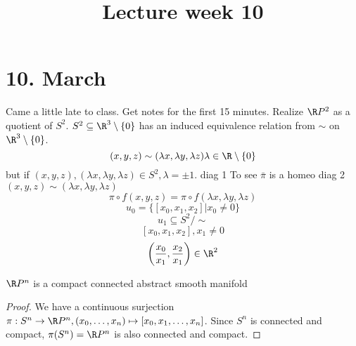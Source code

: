 \title{Lecture week 10}
\maketitle
\section{10. March}
Came a little late to class. Get notes for the first 15 minutes.
\newline Realize $\R P^2$ as a quotient of $S^2$. $S^2\subseteq \R^3\setminus\{0\}$ has an induced equivalence relation from $\sim$ on $\R^3\setminus\{0\}$.
  $$(x,y,z) \sim (\lambda x, \lambda y, \lambda z) \lambda \in \R\setminus\{0\}$$
  but if $(x,y,z), (\lambda x, \lambda y, \lambda z)\in S^2, \lambda = \pm 1$.
  \newline diag 1
  \newline
   To see $\bar{\pi}$ is a homeo
  \newline diag 2
  \newline $(x,y,z)\sim (\lambda x, \lambda y, \lambda z)$
  $$\pi \circ f(x,y,z) = \pi \circ f(\lambda x, \lambda y, \lambda z)$$
  $$u_0=\{[x_0,x_1,x_2] | x_0 \neq 0 \}$$
  $$u_1 \subseteq S^2/\sim$$
  $$[x_0,x_1,x_2], x_1 \neq 0$$
  $$\left(\frac{x_0}{x_1}, \frac{x_2}{x_1}\right)\in \R^2$$
  \begin{theorem}
    $\R P^n$ is a compact connected abstract smooth manifold
  \end{theorem}
  \begin{proof}
    We have a continuous surjection $\pi : S^n \to \R P^n, (x_0,\dots, x_n)\mapsto [x_0,x_1, \dots , x_n]$. Since $S^n$ is connected and compact, $\pi (S^n)=\R P^n$ is also connected and compact.
  \end{proof}

